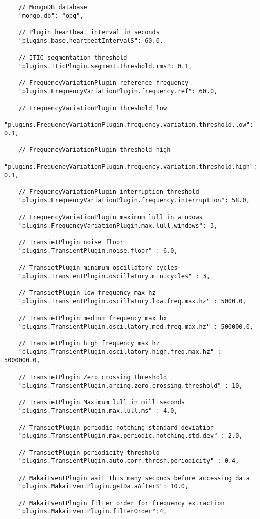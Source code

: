 \begin{verbatim}
	// MongoDB database
	"mongo.db": "opq",

	// Plugin heartbeat interval in seconds
	"plugins.base.heartbeatIntervalS": 60.0,

	// ITIC segmentation threshold
	"plugins.IticPlugin.segment.threshold.rms": 0.1,

	// FrequencyVariationPlugin reference frequency
	"plugins.FrequencyVariationPlugin.frequency.ref": 60.0,

	// FrequencyVariationPlugin threshold low
	"plugins.FrequencyVariationPlugin.frequency.variation.threshold.low": 0.1,

	// FrequencyVariationPlugin threshold high
	"plugins.FrequencyVariationPlugin.frequency.variation.threshold.high": 0.1,

	// FrequencyVariationPlugin interruption threshold
	"plugins.FrequencyVariationPlugin.frequency.interruption": 58.0,

	// FrequencyVariationPlugin maximum lull in windows
	"plugins.FrequencyVariationPlugin.max.lull.windows": 3,

	// TransietPlugin noise floor
	"plugins.TransientPlugin.noise.floor" : 6.0,

	// TransietPlugin minimum oscillatory cycles
	"plugins.TransientPlugin.oscillatory.min.cycles" : 3,

	// TransietPlugin low frequency max hz
	"plugins.TransientPlugin.oscillatory.low.freq.max.hz" : 5000.0,

	// TransietPlugin medium frequency max hx
	"plugins.TransientPlugin.oscillatory.med.freq.max.hz" : 500000.0,

	// TransietPlugin high frequency max hz
	"plugins.TransientPlugin.oscillatory.high.freq.max.hz" : 5000000.0,

	// TransietPlugin Zero crossing threshold
	"plugins.TransientPlugin.arcing.zero.crossing.threshold" : 10,

	// TransietPlugin Maximum lull in milliseconds
	"plugins.TransientPlugin.max.lull.ms" : 4.0,

	// TransietPlugin periodic notching standard deviation
	"plugins.TransientPlugin.max.periodic.notching.std.dev" : 2.0,

	// TransietPlugin periodicity threshold
	"plugins.TransientPlugin.auto.corr.thresh.periodicity" : 0.4,

	// MakaiEventPlugin wait this many seconds before accessing data
	"plugins.MakaiEventPlugin.getDataAfterS": 10.0,

	// MakaiEventPlugin filter order for frequency extraction
	"plugins.MakaiEventPlugin.filterOrder":4,


\end{verbatim}
